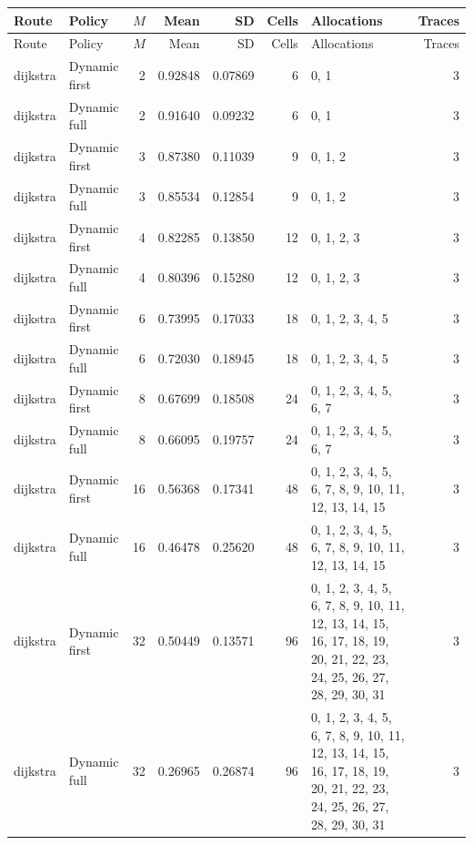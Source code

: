 \documentclass[10pt,a4paper]{article}
\begin{document}
\tiny\setlength{\tabcolsep}{2pt}\begin{longtable}{@{}p{23mm}p{29mm}rrrrp{36mm}r@{}}
\toprule Route & Policy & $M$ & Mean & SD & Cells & Allocations & Traces \\ \midrule\endfirsthead
\toprule Route & Policy & $M$ & Mean & SD & Cells & Allocations & Traces \\ \midrule\endhead
\bottomrule\endfoot
dijkstra & Dynamic first & 2 & 0.92848 & 0.07869 & 6 & 0, 1 & 3 \\
dijkstra & Dynamic full & 2 & 0.91640 & 0.09232 & 6 & 0, 1 & 3 \\
dijkstra & Dynamic first & 3 & 0.87380 & 0.11039 & 9 & 0, 1, 2 & 3 \\
dijkstra & Dynamic full & 3 & 0.85534 & 0.12854 & 9 & 0, 1, 2 & 3 \\
dijkstra & Dynamic first & 4 & 0.82285 & 0.13850 & 12 & 0, 1, 2, 3 & 3 \\
dijkstra & Dynamic full & 4 & 0.80396 & 0.15280 & 12 & 0, 1, 2, 3 & 3 \\
dijkstra & Dynamic first & 6 & 0.73995 & 0.17033 & 18 & 0, 1, 2, 3, 4, 5 & 3 \\
dijkstra & Dynamic full & 6 & 0.72030 & 0.18945 & 18 & 0, 1, 2, 3, 4, 5 & 3 \\
dijkstra & Dynamic first & 8 & 0.67699 & 0.18508 & 24 & 0, 1, 2, 3, 4, 5, 6, 7 & 3 \\
dijkstra & Dynamic full & 8 & 0.66095 & 0.19757 & 24 & 0, 1, 2, 3, 4, 5, 6, 7 & 3 \\
dijkstra & Dynamic first & 16 & 0.56368 & 0.17341 & 48 & 0, 1, 2, 3, 4, 5, 6, 7, 8, 9, 10, 11, 12, 13, 14, 15 & 3 \\
dijkstra & Dynamic full & 16 & 0.46478 & 0.25620 & 48 & 0, 1, 2, 3, 4, 5, 6, 7, 8, 9, 10, 11, 12, 13, 14, 15 & 3 \\
dijkstra & Dynamic first & 32 & 0.50449 & 0.13571 & 96 & 0, 1, 2, 3, 4, 5, 6, 7, 8, 9, 10, 11, 12, 13, 14, 15, 16, 17, 18, 19, 20, 21, 22, 23, 24, 25, 26, 27, 28, 29, 30, 31 & 3 \\
dijkstra & Dynamic full & 32 & 0.26965 & 0.26874 & 96 & 0, 1, 2, 3, 4, 5, 6, 7, 8, 9, 10, 11, 12, 13, 14, 15, 16, 17, 18, 19, 20, 21, 22, 23, 24, 25, 26, 27, 28, 29, 30, 31 & 3 \\
\end{longtable}\normalsize\setlength{\tabcolsep}{6pt}
\clearpage
\end{document}
